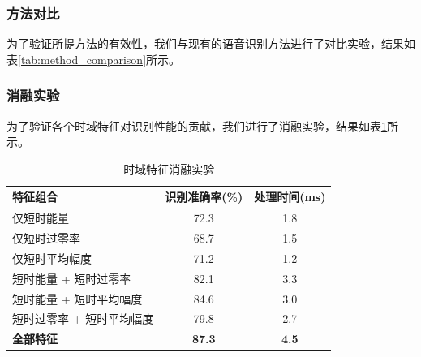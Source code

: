 \documentclass[sigconf,nonacm]{acmart}
\begin{document}
\subsubsection{方法对比}

为了验证所提方法的有效性，我们与现有的语音识别方法进行了对比实验，结果如表\ref{tab:method_comparison}所示。



\subsubsection{消融实验}

为了验证各个时域特征对识别性能的贡献，我们进行了消融实验，结果如表\ref{tab:ablation_study}所示。

\begin{table}[htbp]
\caption{时域特征消融实验}
\label{tab:ablation_study}
\begin{center}
\begin{tabular}{lcc}
\toprule
\textbf{特征组合} & \textbf{识别准确率(\%)} & \textbf{处理时间(ms)} \\
\midrule
仅短时能量 & 72.3 & 1.8 \\
仅短时过零率 & 68.7 & 1.5 \\
仅短时平均幅度 & 71.2 & 1.2 \\
短时能量 + 短时过零率 & 82.1 & 3.3 \\
短时能量 + 短时平均幅度 & 84.6 & 3.0 \\
短时过零率 + 短时平均幅度 & 79.8 & 2.7 \\
\midrule
\textbf{全部特征} & \textbf{87.3} & \textbf{4.5} \\
\bottomrule
\end{tabular}
\end{center}
\end{table}
\end{document}
